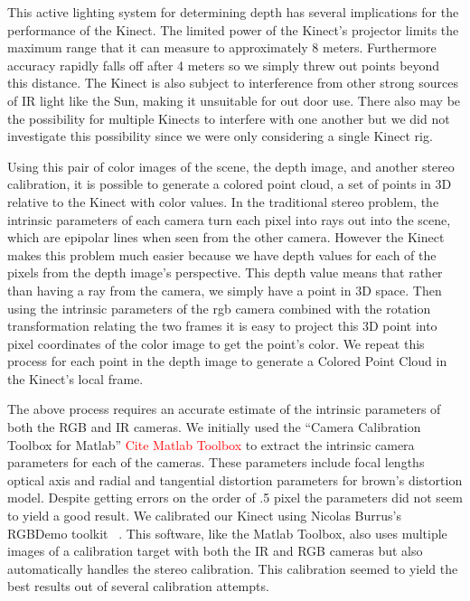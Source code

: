 \documentclass[letterpaper, 10pt, conference]{ieeeconf}
\newcommand{\xxx}[1]{\textcolor{red}{#1}}
\begin{document}
This active lighting system for determining depth has several implications for the performance of the Kinect.  The limited power of the Kinect’s projector limits the maximum range that it can measure to approximately 8 meters.  Furthermore accuracy rapidly falls off after 4 meters so we simply threw out points beyond this distance.   The Kinect is also subject to interference from other strong sources of IR light like the Sun, making it unsuitable for out door use.  There also may be the possibility for multiple Kinects to interfere with one another but we did not investigate this possibility since we were only considering a single Kinect rig.  

Using this pair of color images of the scene, the depth image, and another stereo calibration, it is possible to generate a colored point cloud, a set of points in 3D relative to the Kinect with color values.  In the traditional stereo problem, the intrinsic parameters of each camera turn each pixel into rays out into the scene, which are epipolar lines when seen from the other camera.  However the Kinect makes this problem much easier because we have depth values for each of the pixels from the depth image’s perspective.  This depth value means that rather than having a ray from the camera, we simply have a point in 3D space.  Then using the intrinsic parameters of the rgb camera combined with the rotation transformation relating the two frames it is easy to project this 3D point into pixel coordinates of the color image to get the point’s color.  We repeat this process for each point in the depth image to generate a Colored Point Cloud in the Kinect’s local frame.  

The above process requires an accurate estimate of the intrinsic parameters of both the RGB and IR cameras.  We initially used the “Camera Calibration Toolbox for Matlab” \xxx{Cite Matlab Toolbox} to extract the intrinsic camera parameters for each of the cameras.  These parameters include focal lengths optical axis and radial and tangential distortion parameters for brown’s distortion model.  Despite getting errors on the order of .5 pixel the parameters did not seem to yield a good result.  We calibrated our Kinect using Nicolas Burrus's RGBDemo toolkit ~\cite{BurrusCalibration}.  This software, like the Matlab Toolbox, also uses multiple images of a calibration target with both the IR and RGB cameras but also automatically handles the stereo calibration.  This calibration seemed to yield the best results out of several calibration attempts.  
\end{document}
